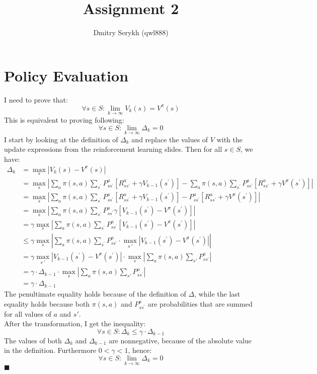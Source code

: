 \documentclass[a4paper]{article}
\title{\vspace{-5cm} Assignment 2}
\author{Dmitry Serykh (qwl888)}
\newcommand*{\QEDA}{\hfill\ensuremath{\blacksquare}}%
\begin{document}
\maketitle
\section{Policy Evaluation}
\label{sec:1}
I need to prove that:
\[
\forall s \in S : \lim _{k \rightarrow \infty} V_{k}(s)=V^{\pi}(s)
\]
This is equivalent to proving following:
\[
\forall s \in S : \lim _{k \rightarrow \infty} \Delta_{k} = 0
\]
I start by looking at the definition of $\Delta_k$ and replace the values of
$V$ with the update expressions from the reinforcement learning slides. Then for
all $s \in S$, we have:
\begin{align*}
  \Delta_{k} &= \max _{s}\left|V_{k}(s)-V^{\pi}(s)\right|\\
  &= \max _{s}\left|
  \sum_{a} \pi(s, a) \sum_{s^{\prime}} P_{s s^{\prime}}^{a}\left[R_{s s^{\prime}}^{a}+\gamma
    V_{k-1}\left(s^{\prime}\right)\right] -
  \sum_{a} \pi(s, a) \sum_{s^{\prime}} P_{s s^{\prime}}^{a}\left[R_{s s^{\prime}}^{a}+\gamma
    V^{\pi}\left(s^{\prime}\right)\right] \right| \\
  &= \max _{s}\left| \sum_{a} \pi(s, a)
  \sum_{s^{\prime}} P_{s s^{\prime}}^{a}\left[R_{s s^{\prime}}^{a}+\gamma
    V_{k-1}\left(s^{\prime}\right)\right] - P_{s s^{\prime}}^{a}\left[R_{s s^{\prime}}^{a}+\gamma
    V^{\pi}\left(s^{\prime}\right)\right]\right| \\
  &= \max _{s}\left| \sum_{a} \pi(s, a)\sum_{s^{\prime}} P_{s s^{\prime}}^{a} \gamma
  \left[V_{k-1}\left(s^{\prime}\right) - V^{\pi}\left(s^{\prime}\right)\right]
  \right| \\
  &= \gamma \max _{s}\left| \sum_{a} \pi(s, a)\sum_{s^{\prime}} P_{s s^{\prime}}^{a}
  \left[V_{k-1}\left(s^{\prime}\right) - V^{\pi}\left(s^{\prime}\right)\right]
  \right| \\
  & \leq \gamma  \max _{s}\left| \sum_{a} \pi(s, a)\sum_{s^{\prime}} P_{s s^{\prime}}^{a}
  \cdot \max _{s~{\prime}} \left|
  V_{k-1}\left(s^{\prime}\right) - V^{\pi}\left(s^{\prime}\right) \right|
  \right| \\
  & = \gamma \max _{s~{\prime}} \left|
  V_{k-1}\left(s^{\prime}\right) - V^{\pi}\left(s^{\prime}\right) \right| \cdot
  \max _{s}\left| \sum_{a} \pi(s, a)\sum_{s'} P_{s s^{\prime}}^{a}
  \right| \\
  &= \gamma \cdot \Delta_{k-1} \cdot
  \max _{s}\left| \sum_{a} \pi(s, a)\sum_{s'} P_{s s^{\prime}}^{a}
  \right| \\
  &= \gamma \cdot \Delta_{k-1} 
\end{align*}
The penultimate equality holds because of the definition of $\Delta$, while
the last equality holds because both $\pi(s,a)$ and
$P_{s s^{\prime}}^{a}$ are probabilities that are summed for all values of
$a$ and $s'$. \\
After the transformation, I get the inequality:
\[
\forall s \in S : \Delta_k  \leq \gamma \cdot \Delta_{k-1}
\]
The values of both $\Delta_k$ and $\Delta_{k-1}$ are nonnegative, because
of the absolute value in the definition. Furthermore $0 < \gamma < 1$, hence:
\[
\forall s \in S : \lim _{k \rightarrow \infty} \Delta_{k} = 0
\]
\QEDA
\end{document}
